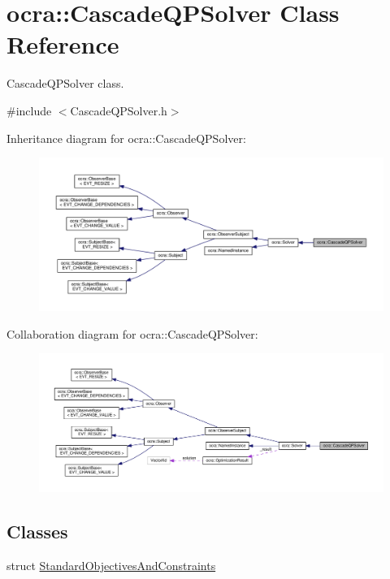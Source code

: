 \hypertarget{classocra_1_1CascadeQPSolver}{}\section{ocra\+:\+:Cascade\+Q\+P\+Solver Class Reference}
\label{classocra_1_1CascadeQPSolver}


Cascade\+Q\+P\+Solver class.  




{\ttfamily \#include $<$Cascade\+Q\+P\+Solver.\+h$>$}



Inheritance diagram for ocra\+:\+:Cascade\+Q\+P\+Solver\+:
\nopagebreak
\begin{figure}[H]
\begin{center}
\leavevmode
\includegraphics[width=350pt]{d5/d00/classocra_1_1CascadeQPSolver__inherit__graph}
\end{center}
\end{figure}


Collaboration diagram for ocra\+:\+:Cascade\+Q\+P\+Solver\+:
\nopagebreak
\begin{figure}[H]
\begin{center}
\leavevmode
\includegraphics[width=350pt]{d0/dfe/classocra_1_1CascadeQPSolver__coll__graph}
\end{center}
\end{figure}
\subsection*{Classes}
\begin{DoxyCompactItemize}
\item 
struct \hyperlink{structocra_1_1CascadeQPSolver_1_1StandardObjectivesAndConstraints}{Standard\+Objectives\+And\+Constraints}
\end{DoxyCompactItemize}
